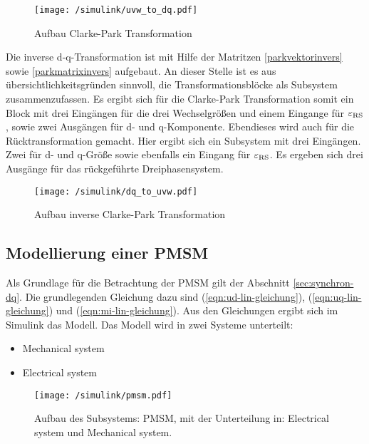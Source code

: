 \begin{figure}[htb!]
	\centering
	\texttt{[image: /simulink/uvw\_to\_dq.pdf]}
	\label{fig:uvw_to_dq}
	\caption{Aufbau Clarke-Park Transformation}
\end{figure}

Die inverse d-q-Transformation ist mit Hilfe der Matritzen \ref{parkvektorinvers} sowie \ref{parkmatrixinvers} aufgebaut.
An dieser Stelle ist es aus übersichtlichkeitsgründen sinnvoll, die Transformationsblöcke als Subsystem zusammenzufassen.
Es ergibt sich für die Clarke-Park Transformation somit ein Block mit drei Eingängen für die drei Wechselgrößen und einem Eingange für $\varepsilon_{\mathrm{RS}}$, sowie zwei Ausgängen für d- und q-Komponente.
Ebendieses wird auch für die Rücktransformation gemacht. 
Hier ergibt sich ein Subsystem mit drei Eingängen. 
Zwei für d- und q-Größe sowie ebenfalls ein Eingang für $\varepsilon_{\mathrm{RS}}$.
Es ergeben sich drei Ausgänge für das rückgeführte Dreiphasensystem.

\begin{figure}[htb!]
	\centering
	\texttt{[image: /simulink/dq\_to\_uvw.pdf]}
	\label{fig:dq_to_uvw}
	\caption{Aufbau inverse Clarke-Park Transformation}
\end{figure}


\subsection{Modellierung einer PMSM}

Als Grundlage für die Betrachtung der PMSM gilt der Abschnitt \ref{sec:synchron-dq}.
Die grundlegenden Gleichung dazu sind (\ref{eqn:ud-lin-gleichung}), (\ref{eqn:uq-lin-gleichung}) und (\ref{eqn:mi-lin-gleichung}).
Aus den Gleichungen ergibt sich im Simulink das Modell.
Das Modell wird in zwei Systeme unterteilt:

\begin{itemize}
	\item Mechanical system
	\item Electrical system
\end{itemize}

\begin{figure}[h!]
	\centering
	\texttt{[image: /simulink/pmsm.pdf]}
	\label{fig:pmsm}
	\caption{Aufbau des Subsystems: PMSM, mit der Unterteilung in: Electrical system und Mechanical system.}
\end{figure}

